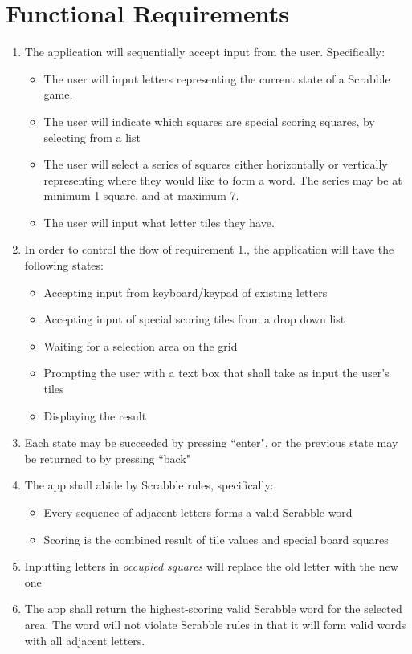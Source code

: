 \documentclass[12pt, oneside]{article}
\begin{document}

\section{Functional Requirements}

\begin{enumerate}[1.]
	\item The application will sequentially accept input from the user.  Specifically:
	\begin{itemize}
		\item The user will input letters representing the current state of a Scrabble game.
		\item The user will indicate which squares are special scoring squares, by selecting from a list
		\item The user will select a series of squares either horizontally or vertically representing 				where they would like to form a word.  The series may be at minimum 1 square, and at 			maximum 7.
		\item The user will input what letter tiles they have.
	\end{itemize}
	
	\item In order to control the flow of requirement 1., the application will have the following states:
	\begin{itemize}
		\item Accepting input from keyboard/keypad of existing letters
		\item Accepting input of special scoring tiles from a drop down list
		\item Waiting for a selection area on the grid
		\item Prompting the user with a text box that shall take as input the user's tiles
		\item Displaying the result
	\end{itemize}
	\item Each state may be succeeded by pressing ``enter", or the previous state may be returned to 		by pressing ``back"
	\item The app shall abide by Scrabble rules, specifically:
	\begin{itemize}
		\item Every sequence of adjacent letters forms a valid Scrabble word
		\item Scoring is the combined result of tile values and special board squares
	\end{itemize}
	\item Inputting letters in \textit{occupied squares} will replace the old letter with the new one
	\item The app shall return the highest-scoring valid Scrabble word for the selected area.  The word 		will not violate Scrabble rules in that it will form valid words with all adjacent letters. 
\end{enumerate}
\end{document}
